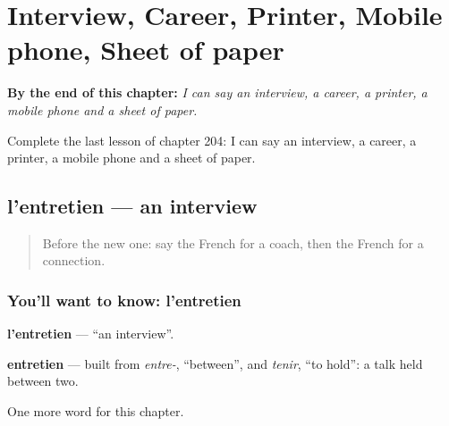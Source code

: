 
\chapter{Interview, Career, Printer, Mobile phone, Sheet of paper}
\label{ch:fr-interview-career-printer-mobile-phone-sheet-of-paper}

\begin{chapteropening}
\textbf{By the end of this chapter:} \emph{I can say an interview, a career, a printer, a mobile phone and a sheet of paper.}

Complete the last lesson of chapter 204: I can say an interview, a career, a printer, a mobile phone and a sheet of paper.
\end{chapteropening}

\section[l'entretien]{l'entretien — an interview}

\label{lesson:FR-C204-entretien}



\begin{quote}
Before the new one: say the French for a coach, then the French for a connection.
\end{quote}

\subsection*{You'll want to know: l'entretien}
\textbf{l'entretien} — \textquotedblleft{}an interview\textquotedblright{}.

\begin{cousinweb}
\textbf{entretien} — built from \emph{entre-}, \textquotedblleft{}between\textquotedblright{}, and \emph{tenir}, \textquotedblleft{}to hold\textquotedblright{}: a talk held between two.
\end{cousinweb}

\begin{grammarlens}[title={What you've built}]
One more word for this chapter.
\end{grammarlens}

